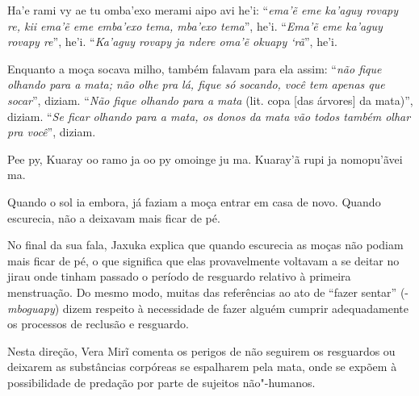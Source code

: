 \begin{paracol}{2}
\footnotesize
\vspace*{0.8cm}

\noindent
Ha'e rami vy ae tu omba'exo merami aipo avi he'i: ``\emph{ema'ẽ eme
ka'aguy rovapy re, kii ema'ẽ eme emba'exo tema, mba'exo tema}'', he'i.
``\emph{Ema'ẽ eme ka'aguy rovapy re}'', he'i. ``\emph{Ka'aguy rovapy ja
ndere oma'ẽ okuapy `rã}'', he'i.

\bigskip

\switchcolumn
\noindent
Enquanto a moça socava milho, também falavam para ela assim: ``\emph{não
fique olhando para a mata; não olhe pra lá, fique só socando, você tem
apenas que socar}'', diziam. ``\emph{Não fique olhando para a mata}
(lit. copa [das árvores] da mata)'', diziam. ``\emph{Se ficar
olhando para a mata, os donos da mata vão todos também olhar pra
você}'', diziam.

\smallskip

\switchcolumn
\medskip
\noindent
Pee py, Kuaray oo ramo ja oo py omoinge ju ma. Kuaray’ã rupi ja
nomopu’ãvei ma. 

\bigskip

\switchcolumn
\noindent
Quando o sol ia embora, já faziam a moça entrar em casa de novo. Quando
escurecia, não a deixavam mais ficar de pé.
\end{paracol}

\bigskip

No final da sua fala, Jaxuka explica que quando escurecia as moças não
podiam mais ficar de pé, o que significa que elas provavelmente
voltavam a se deitar no jirau onde tinham passado o período de
resguardo relativo à primeira menstruação. Do mesmo modo, muitas das
referências ao ato de ``fazer sentar'' (-\emph{mboguapy}) dizem respeito à
necessidade de fazer alguém cumprir adequadamente os processos de
reclusão e resguardo. 

Nesta direção, Vera Mirĩ comenta os perigos de não seguirem os
resguardos ou deixarem as substâncias corpóreas se espalharem pela
mata, onde se expõem à possibilidade de predação por parte de sujeitos
não"-humanos. 

\bigskip

